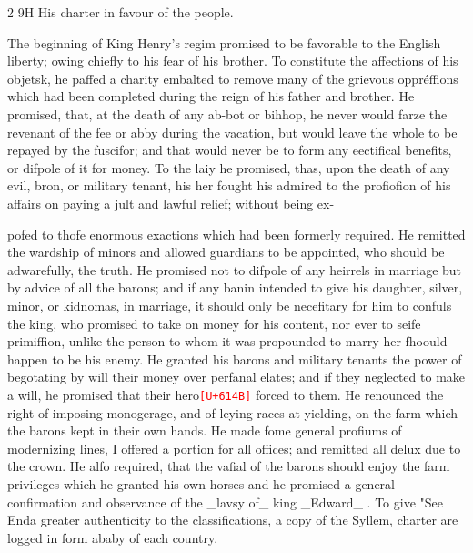 \documentclass[10pt]{article}
\newcommand{\unk}[1]{\textcolor{red}{\texttt{\scriptsize[U+#1]}}}
\begin{document}
\begin{multicols}{2}
9H His charter in favour of the people.

The beginning of King Henry's regim promised to be favorable to the English liberty; owing chiefly to his fear of his brother. To constitute the affections of his objetsk, he paffed a charity embalted to remove many of the grievous oppréffions which had been completed during the reign of his father and brother. He promised, that, at the death of any ab-bot or bihhop, he never would farze the revenant of the fee or abby during the vacation, but would leave the whole to be repayed by the fuscifor; and that would never be to form any eectifical benefits, or difpole of it for money. To the laiy he promised, thas, upon the death of any evil, bron, or military tenant, his her fought his admired to the profiofion of his affairs on paying a jult and lawful relief; without being ex-

pofed to thofe enormous exactions which had been formerly required. He remitted the wardship of minors and allowed guardians to be appointed, who should be adwarefully, the truth. He promised not to difpole of any heirrels in marriage but by advice of all the barons; and if any banin intended to give his daughter, silver, minor, or kidnomas, in marriage, it should only be necefitary for him to confuls the king, who promised to take on money for his content, nor ever to seife primiffion, unlike the person to whom it was propounded to marry her fhoould happen to be his enemy. He granted his barons and military tenants the power of begotating by will their money over perfanal elates; and if they neglected to make a will, he promised that their hero\unk{614B} forced to them. He renounced the right of imposing monogerage, and of leying races at yielding, on the farm which the barons kept in their own hands. He made fome general profiums of modernizing lines, I offered a portion for all offices; and remitted all delux due to the crown. He alfo required, that the vafial of the barons should enjoy the farm privileges which he granted his own horses and he promised a general confirmation and observance of the \_lavsy of\_ king \_Edward\_ . To give "See Enda greater authenticity to the classifications, a copy of the Syllem, charter are logged in form ababy of each country.


\end{multicols}
\end{document}
